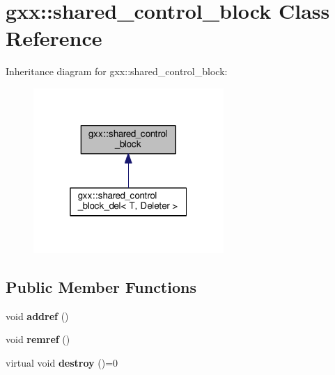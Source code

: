\hypertarget{classgxx_1_1shared__control__block}{}\section{gxx\+:\+:shared\+\_\+control\+\_\+block Class Reference}
\label{classgxx_1_1shared__control__block}


Inheritance diagram for gxx\+:\+:shared\+\_\+control\+\_\+block\+:
\nopagebreak
\begin{figure}[H]
\begin{center}
\leavevmode
\includegraphics[width=205pt]{classgxx_1_1shared__control__block__inherit__graph}
\end{center}
\end{figure}
\subsection*{Public Member Functions}
\begin{DoxyCompactItemize}
\item 
void {\bfseries addref} ()\hypertarget{classgxx_1_1shared__control__block_a85b5fb2f108e0f1ba51fea6065ec1e42}{}\label{classgxx_1_1shared__control__block_a85b5fb2f108e0f1ba51fea6065ec1e42}

\item 
void {\bfseries remref} ()\hypertarget{classgxx_1_1shared__control__block_a250fb490552a63c7e31e2eb26a435424}{}\label{classgxx_1_1shared__control__block_a250fb490552a63c7e31e2eb26a435424}

\item 
virtual void {\bfseries destroy} ()=0\hypertarget{classgxx_1_1shared__control__block_a53a030dfdf37e528d374b602d6000e82}{}\label{classgxx_1_1shared__control__block_a53a030dfdf37e528d374b602d6000e82}

\end{DoxyCompactItemize}
